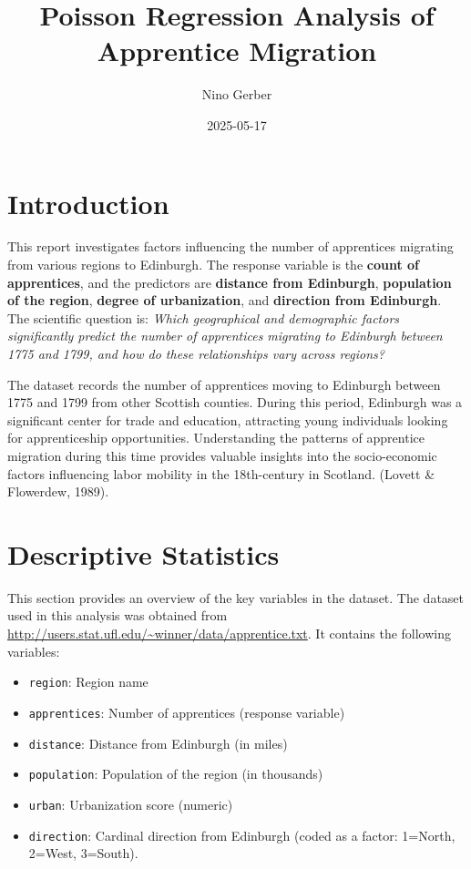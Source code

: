 \documentclass[
  12pt,
]{article}
\title{Poisson Regression Analysis of Apprentice Migration}
\author{Nino Gerber}
\date{2025-05-17}
\providecommand{\tightlist}{%
  \setlength{\itemsep}{0pt}\setlength{\parskip}{0pt}}
\begin{document}
\maketitle

\section{Introduction}\label{introduction}

This report investigates factors influencing the number of apprentices
migrating from various regions to Edinburgh. The response variable is
the \textbf{count of apprentices}, and the predictors are
\textbf{distance from Edinburgh}, \textbf{population of the region},
\textbf{degree of urbanization}, and \textbf{direction from Edinburgh}.
The scientific question is: \emph{Which geographical and demographic
factors significantly predict the number of apprentices migrating to
Edinburgh between 1775 and 1799, and how do these relationships vary
across regions?}

The dataset records the number of apprentices moving to Edinburgh
between 1775 and 1799 from other Scottish counties. During this period,
Edinburgh was a significant center for trade and education, attracting
young individuals looking for apprenticeship opportunities.
Understanding the patterns of apprentice migration during this time
provides valuable insights into the socio-economic factors influencing
labor mobility in the 18th-century in Scotland. (Lovett \& Flowerdew,
1989).

\section{Descriptive Statistics}\label{descriptive-statistics}

This section provides an overview of the key variables in the dataset.
The dataset used in this analysis was obtained from
\url{http://users.stat.ufl.edu/~winner/data/apprentice.txt}. It contains
the following variables:

\begin{itemize}
\tightlist
\item
  \texttt{region}: Region name
\item
  \texttt{apprentices}: Number of apprentices (response variable)
\item
  \texttt{distance}: Distance from Edinburgh (in miles)
\item
  \texttt{population}: Population of the region (in thousands)
\item
  \texttt{urban}: Urbanization score (numeric)
\item
  \texttt{direction}: Cardinal direction from Edinburgh (coded as a
  factor: 1=North, 2=West, 3=South).
\end{itemize}
\end{document}
